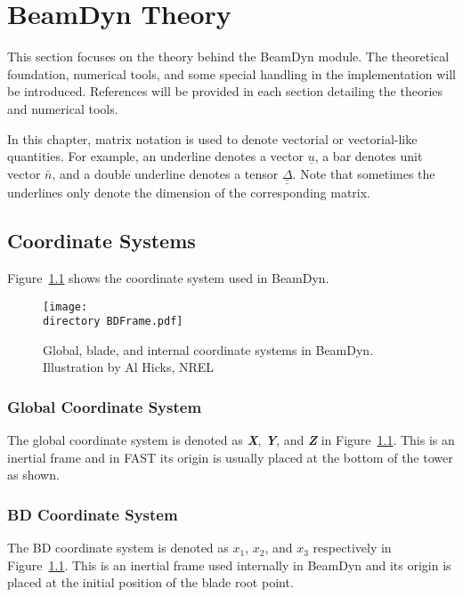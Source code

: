 \chapter{BeamDyn Theory}

This section focuses on the theory behind the BeamDyn module. 
The theoretical foundation, numerical tools, and some special handling in the implementation will be introduced. References will be provided in each section detailing the theories and numerical tools.


In this chapter, matrix notation is used to denote vectorial or vectorial-like quantities. 
For example, an underline denotes a vector $\underline{u}$, a bar denotes unit vector $\bar{n}$, and a double underline denotes a tensor $\underline{\underline{\Delta}}$. 
Note that sometimes the underlines only denote the dimension of the corresponding matrix.

\section{Coordinate Systems}
Figure~\ref{fig:BDFrame}  shows the coordinate system used in BeamDyn.
\begin{figure}[h!tp]
    \centering
    \texttt{[image: \\directory BDFrame.pdf]}
    \caption{Global, blade, and internal coordinate systems in BeamDyn. Illustration by Al Hicks, NREL}
    \label{fig:BDFrame}
\end{figure}

\subsection{Global Coordinate System}
The global coordinate system is denoted as \textbf{ {\it X}}, \textbf{ {\it Y}}, and \textbf{ {\it Z}} in Figure~\ref{fig:BDFrame}. 
This is an inertial frame and in FAST its origin is usually placed at the bottom of the tower as shown.

\subsection{BD Coordinate System}
The BD coordinate system is denoted as $x_1$, $x_2$, and $x_3$ respectively in Figure~\ref{fig:BDFrame}. 
This is an inertial frame used internally in BeamDyn and its origin is placed at the initial position of the blade root point.

